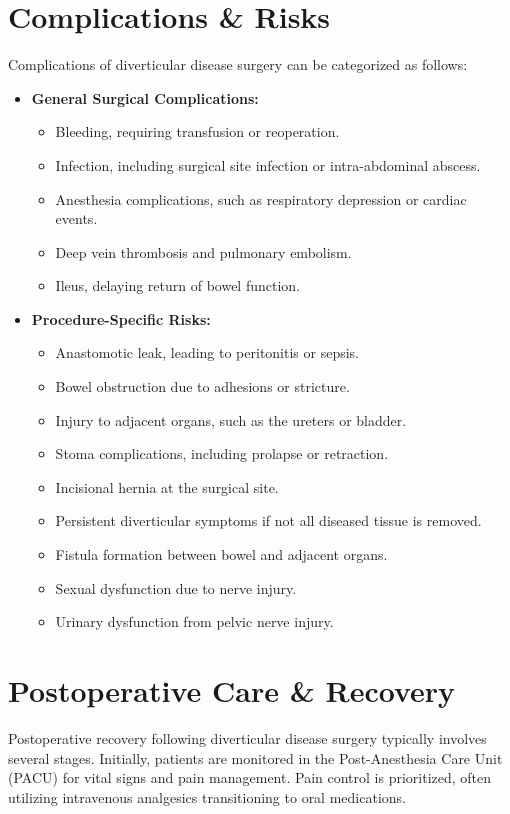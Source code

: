 \section*{Complications \& Risks}
Complications of diverticular disease surgery can be categorized as follows:

\begin{itemize}
  \item \textbf{General Surgical Complications:}
    \begin{itemize}
      \item Bleeding, requiring transfusion or reoperation.
      \item Infection, including surgical site infection or intra-abdominal abscess.
      \item Anesthesia complications, such as respiratory depression or cardiac events.
      \item Deep vein thrombosis and pulmonary embolism.
      \item Ileus, delaying return of bowel function.
    \end{itemize}
  
  \item \textbf{Procedure-Specific Risks:}
    \begin{itemize}
      \item Anastomotic leak, leading to peritonitis or sepsis.
      \item Bowel obstruction due to adhesions or stricture.
      \item Injury to adjacent organs, such as the ureters or bladder.
      \item Stoma complications, including prolapse or retraction.
      \item Incisional hernia at the surgical site.
      \item Persistent diverticular symptoms if not all diseased tissue is removed.
      \item Fistula formation between bowel and adjacent organs.
      \item Sexual dysfunction due to nerve injury.
      \item Urinary dysfunction from pelvic nerve injury.
    \end{itemize}
\end{itemize}

\section*{Postoperative Care \& Recovery}
Postoperative recovery following diverticular disease surgery typically involves several stages. Initially, patients are monitored in the Post-Anesthesia Care Unit (PACU) for vital signs and pain management. Pain control is prioritized, often utilizing intravenous analgesics transitioning to oral medications.

